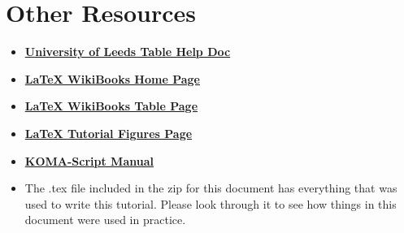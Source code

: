 \documentclass{article}
\begin{document}
	\newpage
	\section{Other Resources}
		\begin{itemize}
			\item \href{https://www1.maths.leeds.ac.uk/latex/TableHelp1.pdf}{\textbf{University of Leeds Table Help Doc}}
			\item \href{https://en.wikibooks.org/wiki/LaTeX}{\textbf{\LaTeX{} WikiBooks Home Page}}
			\item \href{https://en.wikibooks.org/wiki/LaTeX/Tables}{\textbf{\LaTeX{} WikiBooks Table Page}}
			\item \href{https://www.latex-tutorial.com/tutorials/figures/}{\textbf{\LaTeX{} Tutorial Figures Page}}
			\item \href{http://texdoc.net/texmf-dist/doc/latex/koma-script/scrguien.pdf}{\textbf{KOMA-Script Manual}}
			\item The .tex file included in the zip for this document has everything that was used to write this tutorial. Please look through it to see how things in this document were used in practice.
		\end{itemize}
\end{document}
